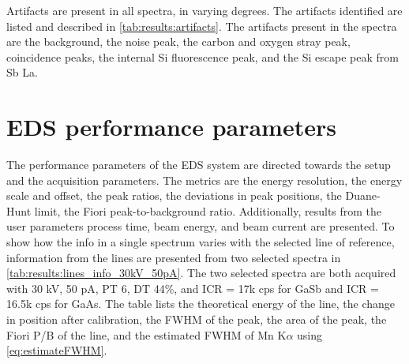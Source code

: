 Artifacts are present in all spectra, in varying degrees.
The artifacts identified are listed and described in \cref{tab:results:artifacts}.
The artifacts present in the spectra are the background, the noise peak, the carbon and oxygen stray peak, coincidence peaks, the internal Si fluorescence peak, and the Si escape peak from Sb La.






























\section{EDS performance parameters}
\label{results:performance}

The performance parameters of the EDS system are directed towards the setup and the acquisition parameters.
The metrics are the energy resolution, the energy scale and offset, the peak ratios, the deviations in peak positions, the Duane-Hunt limit, the Fiori peak-to-background ratio.
Additionally, results from the user parameters process time, beam energy, and beam current are presented.
To show how the info in a single spectrum varies with the selected line of reference, information from the lines are presented from two selected spectra in \cref{tab:results:lines_info_30kV_50pA}.
The two selected spectra are both acquired with 30 kV, 50 pA, PT 6, DT 44\%, and ICR = 17k cps for GaSb and ICR = 16.5k cps for GaAs.
The table lists the theoretical energy of the line, the change in position after calibration, the FWHM of the peak, the area of the peak, the Fiori P/B of the line, and the estimated FWHM of Mn K$\alpha$ using \cref{eq:estimateFWHM}.


